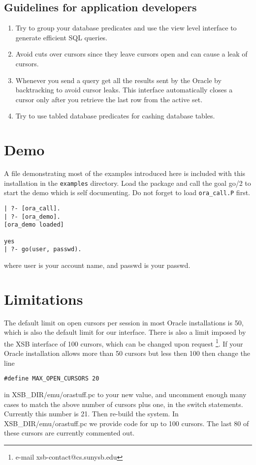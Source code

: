 \subsection{Guidelines for application developers} \label{sec:Guide}
\begin{enumerate}
\item  Try to group your database predicates and use the view level interface
   to generate efficient SQL queries.
\item  Avoid cuts over cursors since they leave cursors open and can cause
   a leak of cursors.
\item Whenever you send a query get all the results sent by the Oracle by
   backtracking to avoid cursor leaks.  This interface automatically closes a 
   cursor only after you retrieve the last row from the active set.
\item Try to use tabled database predicates for cashing database tables.
\end{enumerate}



\section{Demo}
A file demonstrating most of the examples introduced here is included
with this installation in the {\tt examples} directory.  Load the
package and call the goal go/2 to start the demo which is self
documenting.  Do not forget to load {\tt ora\_call.P} first.

\begin{verbatim}
| ?- [ora_call].
| ?- [ora_demo].
[ora_demo loaded]

yes
| ?- go(user, passwd).
\end{verbatim}
where user is your account name, and passwd is your passwd.


\section{Limitations} \label{oracle:limitations}
The default limit on open cursors per session in most Oracle
installations is 50, which is also the default limit for our
interface.  There is also a limit imposed by the XSB interface of 100
cursors, which can be changed upon request
\footnote{e-mail xsb-contact@cs.sunysb.edu}.
If your Oracle installation allows more than 50 cursors but
less then 100 then change the line 
\begin{verbatim} 
#define MAX_OPEN_CURSORS 20 
\end{verbatim} 
in XSB\_DIR/emu/orastuff.pc to your new value, and uncomment enough
many cases to match the above number of cursors plus one, in the switch
statements. Currently this number is 21. Then re-build the system. In 
XSB\_DIR/emu/orastuff.pc we provide code for up to 100 cursors. The last
80 of these cursors are currently commented out.


